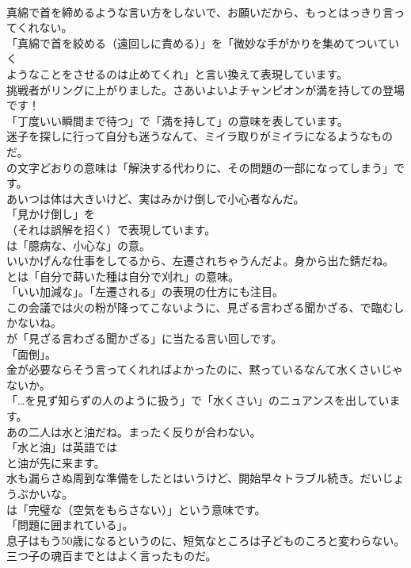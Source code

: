 \documentclass[8pt]{extreport}
\begin{document}
\begin{CJK}{UTF8}{min}
\\	真綿で首を締めるような言い方をしないで、お願いだから、もっとはっきり言ってくれない。 
\\	「真綿で首を絞める（遠回しに責める）」を「微妙な手がかりを集めてついていく
\\	ようなことをさせるのは止めてくれ」と言い換えて表現しています。	
\\	挑戦者がリングに上がりました。さあいよいよチャンピオンが満を持しての登場です！ 
\\	「丁度いい瞬間まで待つ」で「満を持して」の意味を表しています。	
\\	迷子を探しに行って自分も迷うなんて、ミイラ取りがミイラになるようなものだ。 
\\	の文字どおりの意味は「解決する代わりに、その問題の一部になってしまう」です。	
\\	あいつは体は大きいけど、実はみかけ倒しで小心者なんだ。 
\\	「見かけ倒し」を 
\\	（それは誤解を招く）で表現しています。
\\	は「臆病な、小心な」の意。	
\\	いいかげんな仕事をしてるから、左遷されちゃうんだよ。身から出た錆だね。 
\\	とは「自分で蒔いた種は自分で刈れ」の意味。
\\	「いい加減な」。「左遷される」の表現の仕方にも注目。	
\\	この会議では火の粉が降ってこないように、見ざる言わざる聞かざる、で臨むしかないね。 
\\	が「見ざる言わざる聞かざる」に当たる言い回しです。
\\	「面倒」。	
\\	金が必要ならそう言ってくれればよかったのに、黙っているなんて水くさいじゃないか。 
\\	「…を見ず知らずの人のように扱う」で「水くさい」のニュアンスを出しています。	
\\	あの二人は水と油だね。まったく反りが合わない。 
\\	「水と油」は英語では
\\	と油が先に来ます。	
\\	水も漏らさぬ周到な準備をしたとはいうけど、開始早々トラブル続き。だいじょうぶかいな。 
\\	は「完璧な（空気をもらさない）」という意味です。
\\	「問題に囲まれている」。	
\\	息子はもう50歳になるというのに、短気なところは子どものころと変わらない。三つ子の魂百までとはよく言ったものだ。 

\end{CJK}
\end{document}
